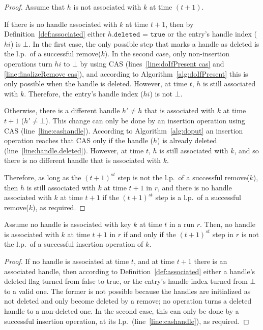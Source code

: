 \begin{proof}
Assume that $h$ is not associated with $k$ at time $(t+1)$.  

If there is no handle associated with $k$ at time $t+1$, then by Definition~\ref{def:associated} either $h\texttt{.deleted = true}$ or the entry's handle index ($hi$) is $\bot$.
In the first case, the only possible step that marks a handle as deleted is the l.p.\ of a successful remove($k$).
In the second case, only non-insertion operations turn $hi$ to $\bot$ by using CAS (lines~\ref{line:doIfPresent cas} and \ref{line:finalizeRemove cas}), and according to Algorithm~\ref{alg:doIfPresent} this is only possible when the handle is deleted. 
However, at time $t$, $h$ is still associated with $k$.
Therefore, the entry's handle index ($hi$) is not $\bot$.

Otherwise, there is a different handle $h' \neq h$ that is associated with $k$ at time $t+1$ ($h' \neq
 \bot$).
This change can only be done by an insertion operation using CAS (line~\ref{line:cashandle}). 
According to Algorithm~\ref{alg:doput} an insertion operation reaches that CAS only if the handle ($h$) is already deleted (line~\ref{line:handle.deleted}). 
However, at time $t$, $h$ is still associated with $k$, and so there is no different handle that is associated with $k$.

Therefore, as long as the $(t+1)^{st}$ step is not the l.p.\ of a successful remove($k$), then $h$ is still associated with $k$ at time $t+1$ in $r$, and there is no handle associated with $k$ at time $t+1$ if the $(t+1)^{st}$ step is a l.p.\ of a successful remove($k$), as required.
\end{proof}

\begin{claim}
\label{claim:insert}
Assume no handle is associated with key $k$ at time $t$ in a run $r$.
Then, no handle is associated with $k$ at time $t+1$ in $r$ if and only if the $(t+1)^{st}$ step in $r$ is not the l.p.\ of a successful insertion operation of $k$.
\end{claim}


\begin{proof}
If no handle is associated at time $t$, and at time $t+1$ there is an associated handle, then according to Definition~\ref{def:associated} either a handle's deleted flag turned from false to true, or the entry's handle index turned from $\bot$ to a valid one.
The former is not possible because the handles are initialized as not deleted and only become deleted by a remove; no operation turns a deleted handle to a non-deleted one. 
In the second case, this can only be done by a successful insertion operation, at its l.p.\ (line~\ref{line:cashandle}), as required.
\end{proof}
 

